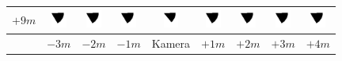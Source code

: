 \begin{tabular}{|c|c|c|c|c|c|c|c|c|}
	\hline 
	$+9m$ &
	\includegraphics[width=0.5cm]{img_Bereich/V2_vid_res_Winkel_Y_-3000_9000.png}&
	\includegraphics[width=0.5cm]{img_Bereich/V2_vid_res_Winkel_Y_-2000_9000.png}&
	\includegraphics[width=0.5cm]{img_Bereich/V2_vid_res_Winkel_Y_-1000_9000.png}&
	\includegraphics[width=0.5cm]{img_Bereich/V2_vid_res_Winkel_Y_0_9000.png}&
	\includegraphics[width=0.5cm]{img_Bereich/V2_vid_res_Winkel_Y_1000_9000.png}&
	\includegraphics[width=0.5cm]{img_Bereich/V2_vid_res_Winkel_Y_2000_9000.png}&
	\includegraphics[width=0.5cm]{img_Bereich/V2_vid_res_Winkel_Y_3000_9000.png}&
	\includegraphics[width=0.5cm]{img_Bereich/V2_vid_res_Winkel_Y_4000_9000.png}\\ 
	\hline 
	& $-3m$ & $-2m$ & $-1m$ &Kamera& $+1m$ & $+2m$ & $+3m$ & $+4m$ \\ 
	\hline 
\end{tabular}